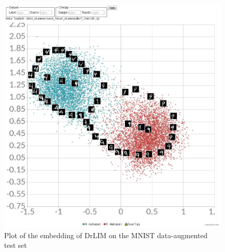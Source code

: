 \documentclass[a4paper,12pt]{report}
\begin{document}
\begin{figure}[<+htpb+>]
    \centering
    \includegraphics{thesis_figures/mnist_cl_drlim.jpg}
    \caption{Plot of the embedding of DrLIM on the MNIST data-augmented test set}
    \label{fig:mnist_cl_drlim}
\end{figure}
\end{document}

